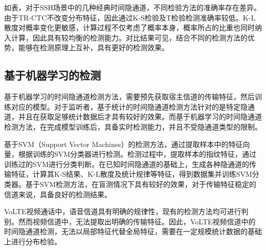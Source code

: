 如表，对于SSH场景中的几种经典时间隐通道，不同检验方法的准确率存在差异。由于TR-CTC不改变分布特征，因此通过K-S检验及T检验检测准确率较低。K-L散度对概率变化更敏感，计算过程不仅考虑了概率本身，概率所占的比重也同时纳入计算，因此具有较均衡的检测能力。对比结果可见，结合不同的检测方法的优势，能够在检测原理上互补，具有更好的检测效果。

\subsection{基于机器学习的检测}
\label{chap:backinfo:detect:machine}

基于机器学习的时间隐通道检测方法，需要预先获取宿主信道的传输特征，然后训练对应的模型。对于监听者，基于统计的时间隐通道检测方法针对的是特定隐通道，并且在获取足够统计数据后才具有较好的效果。而基于机器学习的时间隐通道检测方法，在完成模型训练后，具备实时检测能力，并且不受隐通道类型的限制。

基于SVM（Support Vector Machines）的检测方法，通过提取样本中的特征向量，根据训练的SVM分类器进行检测。检测过程中，提取样本的指纹特征，通过训练过的SVM进行分类判断。在已知时间隐通道的基础上，生成各种隐通道的传输特征，计算其K-S结果、K-L散度及统计规律等特征，得到数据集并训练SVM分类器。基于SVM检测方法，在盲测情况下具有较好的效果，对于传输特征稳定的信道来说，具备良好的检测结果。

VoLTE视频通话中，语音信道具有明确的规律性，现有的检测方法均可进行判别。然而视频信道中，无法提取出明确的传输特征。因此，VoLTE视频信道中的时间隐通道检测，无法以局部特征代替全局特征，需要在一定规模统计数据的基础上进行分布检验。